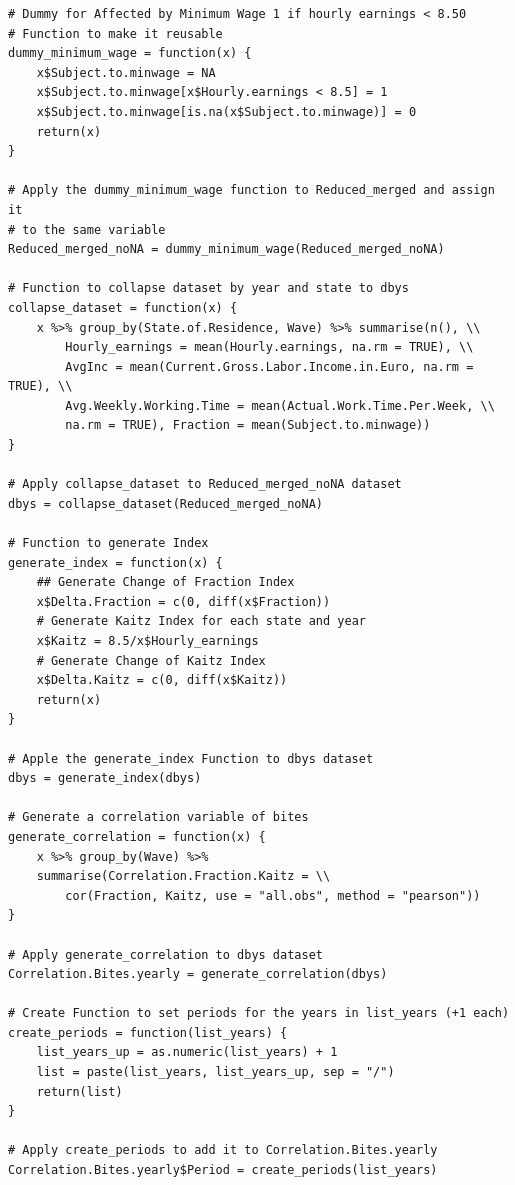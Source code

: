 \documentclass[a4paper]{article}
\begin{document}
{\begin{lstlisting}
# Dummy for Affected by Minimum Wage 1 if hourly earnings < 8.50 
# Function to make it reusable
dummy_minimum_wage = function(x) {
    x$Subject.to.minwage = NA
    x$Subject.to.minwage[x$Hourly.earnings < 8.5] = 1
    x$Subject.to.minwage[is.na(x$Subject.to.minwage)] = 0
    return(x)
}

# Apply the dummy_minimum_wage function to Reduced_merged and assign it 
# to the same variable
Reduced_merged_noNA = dummy_minimum_wage(Reduced_merged_noNA)

# Function to collapse dataset by year and state to dbys
collapse_dataset = function(x) {
    x %>% group_by(State.of.Residence, Wave) %>% summarise(n(), \\ 
    	Hourly_earnings = mean(Hourly.earnings, na.rm = TRUE), \\ 
    	AvgInc = mean(Current.Gross.Labor.Income.in.Euro, na.rm = TRUE), \\ 
    	Avg.Weekly.Working.Time = mean(Actual.Work.Time.Per.Week, \\ 
    	na.rm = TRUE), Fraction = mean(Subject.to.minwage))
}

# Apply collapse_dataset to Reduced_merged_noNA dataset
dbys = collapse_dataset(Reduced_merged_noNA)

# Function to generate Index
generate_index = function(x) {
    ## Generate Change of Fraction Index
    x$Delta.Fraction = c(0, diff(x$Fraction))
    # Generate Kaitz Index for each state and year
    x$Kaitz = 8.5/x$Hourly_earnings
    # Generate Change of Kaitz Index
    x$Delta.Kaitz = c(0, diff(x$Kaitz))
    return(x)
}

# Apple the generate_index Function to dbys dataset
dbys = generate_index(dbys)

# Generate a correlation variable of bites
generate_correlation = function(x) {
    x %>% group_by(Wave) %>% 
    summarise(Correlation.Fraction.Kaitz = \\
    	cor(Fraction, Kaitz, use = "all.obs", method = "pearson"))
}

# Apply generate_correlation to dbys dataset
Correlation.Bites.yearly = generate_correlation(dbys)

# Create Function to set periods for the years in list_years (+1 each)
create_periods = function(list_years) {
    list_years_up = as.numeric(list_years) + 1
    list = paste(list_years, list_years_up, sep = "/")
    return(list)
}

# Apply create_periods to add it to Correlation.Bites.yearly
Correlation.Bites.yearly$Period = create_periods(list_years)


\end{lstlisting}}
\end{document}
